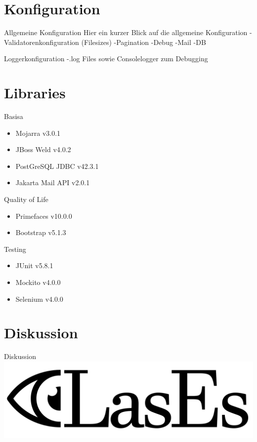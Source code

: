 \documentclass{beamer}
\begin{document}
\section{Konfiguration}
\begin{frame}{Allgemeine Konfiguration}
    Hier ein kurzer Blick auf die allgemeine Konfiguration
    -Validatorenkonfiguration (Filesizes)
    -Pagination
    -Debug
    -Mail
    -DB
\end{frame}

\begin{frame}{Loggerkonfiguration}
    -.log Files sowie Consolelogger zum Debugging
\end{frame}


\section{Libraries}
\begin{frame}{Basis}a
    \begin{itemize}
        \item Mojarra v3.0.1
        \item JBoss Weld v4.0.2
        \item PostGreSQL JDBC v42.3.1
        \item Jakarta Mail API v2.0.1
    \end{itemize}
\end{frame}

\begin{frame}{Quality of Life}
    \begin{itemize}
        \item Primefaces v10.0.0
        \item Bootstrap v5.1.3
    \end{itemize}
\end{frame}

\begin{frame}{Testing}
    \begin{itemize}
        \item JUnit v5.8.1
        \item Mockito v4.0.0
        \item Selenium v4.0.0
    \end{itemize}
\end{frame}


\section{Diskussion}
\begin{frame}{Diskussion}
    \centering
    \includegraphics[width=0.7\linewidth]{../../docs/Pflichtenheft/graphics/LasEs-logo}
\end{frame}
\end{document}

